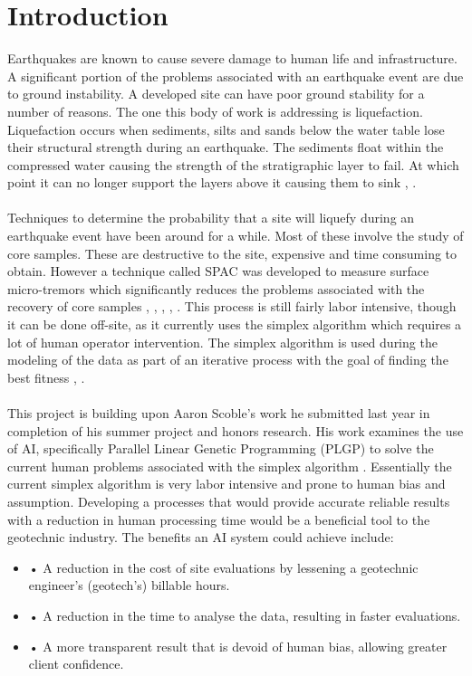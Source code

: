 \chapter{Introduction}\label{C:intro}

Earthquakes are known to cause severe damage to human life and infrastructure. A significant portion of the problems associated with an earthquake event are due to ground instability. A developed site can have poor ground stability for a number of reasons. The one this body of work is addressing is liquefaction. Liquefaction occurs when sediments, silts and sands below the water table lose their structural strength during an earthquake. The sediments float within the compressed water causing the strength of the stratigraphic layer to fail. At which point it can no longer support the layers above it causing them to sink \cite{1}, \cite{2}.
\\\\
Techniques to determine the probability that a site will liquefy during an earthquake event have been around for a while. Most of these involve the study of core samples. These are destructive to the site, expensive and time consuming to obtain. However a technique called SPAC was developed to measure surface micro-tremors which significantly reduces the problems associated with the recovery of core samples \cite{2}, \cite{3}, \cite{5}, \cite{6}, \cite{7}. This process is still fairly labor intensive, though it can be done off-site, as it currently uses the simplex algorithm which requires a lot of human operator intervention. The simplex algorithm is used during the modeling of the data as part of an iterative process with the goal of finding the best fitness \cite{2}, \cite{7}. 
\\ \\
This project is building upon Aaron Scoble's work he submitted last year in completion of his summer project and honors research. His work examines the use of AI, specifically Parallel Linear Genetic Programming (PLGP) to solve the current human problems associated with the simplex algorithm \cite{scoble1}. Essentially the current simplex algorithm is very labor intensive and prone to human bias and assumption. Developing a processes that would provide accurate reliable results with a reduction in human processing time would be a beneficial tool to the geotechnic industry. The benefits an AI system could achieve include:
 
 \begin{itemize}
 \item • A reduction in the cost of site evaluations by lessening a geotechnic engineer’s (geotech’s) billable hours.
 \item • A reduction in the time to analyse the data, resulting in faster evaluations.
 \item • A more transparent result that is devoid of human bias, allowing greater client confidence.
 \end{itemize}

